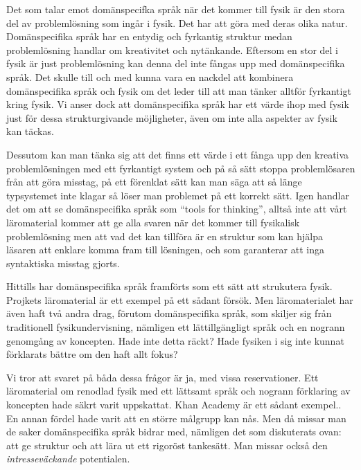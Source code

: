 \begin{draft}
Det som talar emot
domänspecifka språk när det kommer till fysik är den stora del av problemlösning
som ingår i fysik. Det har att göra med deras olika natur. Domänspecifika språk
har en entydig och fyrkantig struktur medan problemlösning handlar om
kreativitet och nytänkande. Eftersom en stor del i fysik är just problemlösning
kan denna del inte fångas upp med domänspecifika språk. Det skulle till och med
kunna vara en nackdel att kombinera domänspecifika språk och fysik om det leder
till att man tänker alltför fyrkantigt kring fysik. Vi anser dock att
domänspecifika språk har ett värde ihop med fysik just för dessa strukturgivande
möjligheter, även om inte alla aspekter av fysik kan täckas. 

Dessutom kan man
tänka sig att det finns ett värde i ett fånga upp den kreativa problemlösningen
med ett fyrkantigt system och på så sätt stoppa problemlösaren från att göra
misstag, på ett förenklat sätt kan man säga att så länge typsystemet inte klagar
så löser man problemet på ett korrekt sätt. Igen handlar det om att se
domänspecifika språk som ``tools for thinking'', alltså inte att vårt
läromaterial kommer att ge alla svaren när det kommer till fysikalisk
problemlösning men att vad det kan tillföra är en struktur som kan hjälpa
läsaren att enklare komma fram till lösningen, och som garanterar att inga
syntaktiska misstag gjorts.

Hittills har domänspecifika språk framförts som ett sätt att strukutera fysik. Projkets läromaterial är ett exempel på ett sådant
försök. Men läromaterialet har även haft två andra drag, förutom domänspecifika
språk, som skiljer sig från traditionell fysikundervisning, nämligen ett
lättillgängligt språk och en nogrann genomgång av koncepten. Hade inte detta
räckt? Hade fysiken i sig inte kunnat förklarats bättre om den haft allt fokus?

Vi tror att svaret på båda dessa frågor är ja, med vissa reservationer. Ett läromaterial om renodlad fysik med ett lättsamt språk och nogrann förklaring av koncepten hade säkrt varit uppskattat. Khan Academy är ett sådant exempel.\cite{khan}. En annan fördel hade varit att en större målgrupp kan nås. Men då missar man de saker domänspecifika språk bidrar med, nämligen det som diskuterats ovan: att ge struktur och att lära ut ett rigoröst tankesätt. Man missar också den \textit{intresseväckande} potentialen.


\end{draft}
